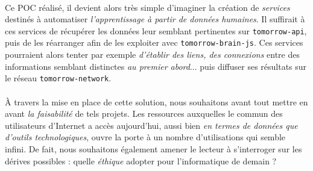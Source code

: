 \paragraph{} Ce POC réalisé, il devient alors très simple d'imaginer la création de \emph{services}
destinés à automatiser \emph{l'apprentissage à partir de données humaines}. Il suffirait à ces services
de récupérer les données leur semblant pertinentes sur \lstinline{tomorrow-api}, puis de les réarranger
afin de les exploiter avec \lstinline{tomorrow-brain-js}. Ces services pourraient alors tenter par 
exemple \emph{d'établir des liens, des connexions} entre des informations semblant distinctes 
\emph{au premier abord}... puis diffuser ses résultats sur le réseau \lstinline{tomorrow-network}. 

\paragraph{} À travers la mise en place de cette solution, nous souhaitons avant tout mettre en
avant \emph{la faisabilité} de tels projets. Les ressources auxquelles le commun des utilisateurs 
d'Internet a accès aujourd'hui, aussi bien \emph{en termes de données que d'outils technologiques},
ouvre la porte à un nombre d'utilisations qui semble infini. De fait, nous souhaitons également
amener le lecteur à s'interroger sur les dérives possibles : quelle \emph{éthique} adopter pour
l'informatique de demain ?